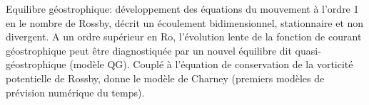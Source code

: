 \sk
Equilibre géostrophique: développement des équations du mouvement à l'ordre 1 en le nombre de Rossby, décrit un écoulement bidimensionnel, stationnaire et non divergent. A un ordre supérieur en $\textrm{Ro}$, l'évolution lente de la fonction de courant géostrophique peut être diagnostiquée par un nouvel équilibre dit quasi-géostrophique (modèle QG). Couplé à l'équation de conservation de la vorticité potentielle de Rossby, donne le modèle de Charney (premiers modèles de prévision numérique du temps).
